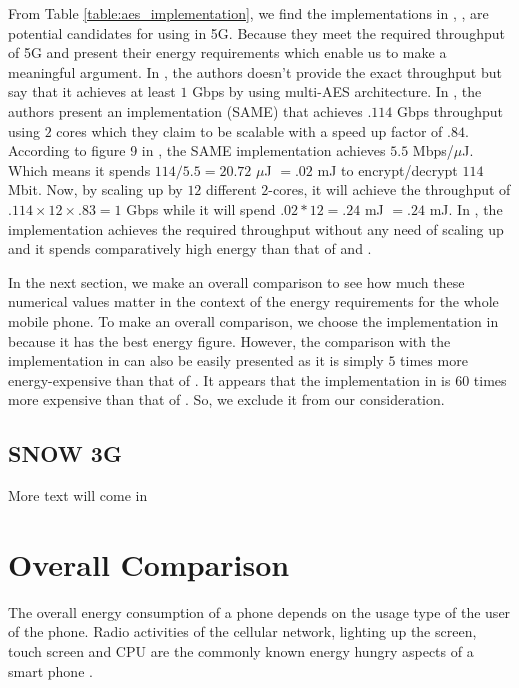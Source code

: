 \documentclass[lnicst,sechang,a4paper]{svmultln}
\begin{document}
From Table \ref{table:aes_implementation}, we find the implementations in \cite{Ruhr_2009}, \cite{Ruhr_2011}, \cite{Pune_2012} are potential candidates for using in 5G. Because they meet the required throughput of 5G and present their energy requirements which enable us to make a meaningful argument. In \cite{Ruhr_2009}, the authors doesn't provide the exact throughput but say that it achieves at least $1$ Gbps by using multi-AES architecture. In \cite{Ruhr_2011}, the authors present an implementation (SAME) that achieves $.114$ Gbps throughput using $2$ cores which they claim to be scalable with a speed up factor of $.84$. According to figure 9 in \cite{Ruhr_2011}, the SAME implementation achieves $5.5$ Mbps/$\mu$J. Which means it spends $114/5.5 = 20.72$ $\mu$J $=.02$ mJ to encrypt/decrypt $114$ Mbit. Now, by scaling up by $12$ different $2$-cores, it will achieve the throughput of $.114 \times 12 \times .83 = 1$ Gbps while it will spend $.02*12=.24$ mJ $=.24$ mJ. In \cite{Pune_2012}, the implementation achieves the required throughput without any need of scaling up and it spends comparatively high energy than that of \cite{Ruhr_2009} and \cite{Ruhr_2011}. 

In the next section, we make an overall comparison to see how much these numerical values matter in the context of the energy requirements for the whole mobile phone. To make an overall comparison, we choose the implementation in \cite{Ruhr_2011} because it has the best energy figure. However, the comparison with the implementation in \cite{Ruhr_2009} can also be easily presented as it is simply $5$ times more energy-expensive than that of \cite{Ruhr_2011}. It appears that the implementation in \cite{Pune_2012} is $60$ times more expensive than that of \cite{Ruhr_2011}. So, we exclude it from our consideration. 

\subsection{SNOW 3G}
\label{sub-sec:snow3gp}
More text will come in

\section{Overall Comparison}
\label{sec:overall_comparison}
The overall energy consumption of a phone depends on the usage type of the user of the phone. Radio activities of the cellular network, lighting up the screen, touch screen and CPU are the commonly known energy hungry aspects of a smart phone \cite{Usenix_2010}. 
\end{document}
